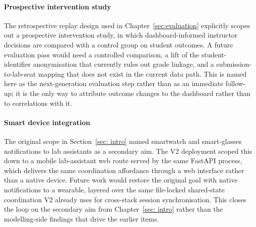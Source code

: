 \paragraph{Prospective intervention study}
The retrospective replay design used in Chapter~\ref{sec:evaluation} explicitly scopes out a prospective intervention study, in which dashboard-informed instructor decisions are compared with a control group on student outcomes.
A future evaluation pass would need a controlled comparison, a lift of the student-identifier anonymisation that currently rules out grade linkage, and a submission-to-lab-seat mapping that does not exist in the current data path.
This is named here as the next-generation evaluation step rather than as an immediate follow-up; it is the only way to attribute outcome changes to the dashboard rather than to correlations with it.

\paragraph{Smart device integration}
The original scope in Section~\ref{sec: intro} named smartwatch and smart-glasses notifications to lab assistants as a secondary aim.
The V2 deployment scoped this down to a mobile lab-assistant web route served by the same FastAPI process, which delivers the same coordination affordance through a web interface rather than a native device.
Future work would restore the original goal with native notifications to a wearable, layered over the same file-locked shared-state coordination V2 already uses for cross-stack session synchronisation.
This closes the loop on the secondary aim from Chapter~\ref{sec: intro} rather than the modelling-side findings that drive the earlier items.
